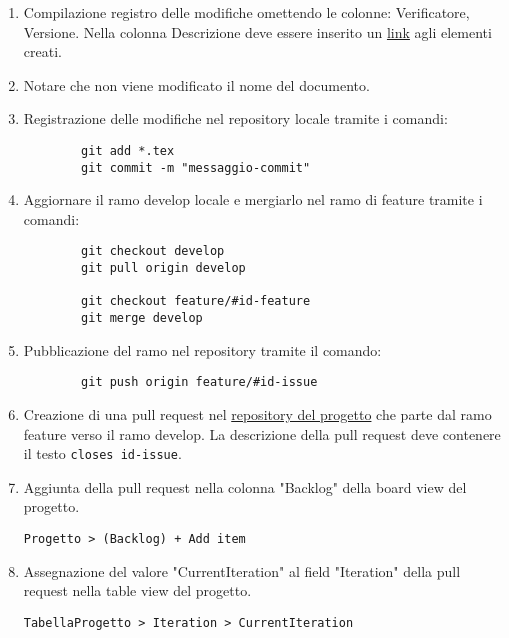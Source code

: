 \documentclass[a4paper, 12pt]{article}
\begin{document}
\begin{enumerate}
    \item Compilazione registro delle modifiche omettendo le colonne: Verificatore, Versione.
    Nella colonna Descrizione deve essere inserito un \hyperref[subsub:link]{link} agli elementi creati.
    
    \item Notare che non viene modificato il nome del documento. 
    
    \item Registrazione delle modifiche nel repository locale tramite i comandi:
    \begin{lstlisting}
        git add *.tex
        git commit -m "messaggio-commit"
    \end{lstlisting}

    \item Aggiornare il ramo develop locale e mergiarlo nel ramo di feature tramite i comandi:
    \begin{lstlisting}
        git checkout develop
        git pull origin develop

        git checkout feature/#id-feature
        git merge develop
    \end{lstlisting}

    \item Pubblicazione del ramo nel repository tramite il comando:
    \begin{lstlisting}
        git push origin feature/#id-issue
    \end{lstlisting}

    \item Creazione di una pull request nel \href{https://github.com/ALT-F4-eng/SorgentiDocumentazione}{repository del progetto} che parte dal ramo feature verso il ramo develop.
    La descrizione della pull request deve contenere il testo \lstinline|closes id-issue|.
    
    \item Aggiunta della pull request nella colonna "Backlog" della board view del progetto.
    
    \lstinline|Progetto > (Backlog) + Add item|
    
    \item Assegnazione del valore "CurrentIteration" al field "Iteration" della pull request nella table view del progetto.
    
    \lstinline|TabellaProgetto > Iteration > CurrentIteration|
   
\end{enumerate}
\end{document}
